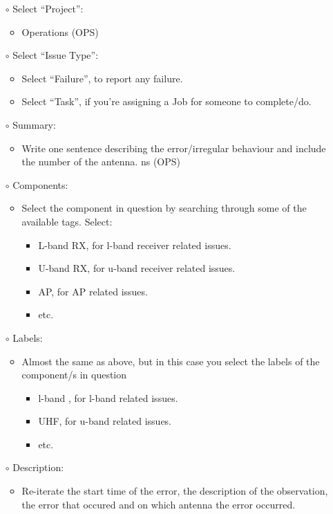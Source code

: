 \begin{itemize}
\begin{itemize}
\item[$\circ$] Select “Project”:
\begin{itemize}
\item Operations (OPS)
\end{itemize} 
\item[$\circ$] Select “Issue Type”:
\begin{itemize}
\item Select “Failure”, to report any failure.
\item Select “Task”, if you're assigning a Job for someone to complete/do.
\end{itemize}
\item[$\circ$] Summary:
\begin{itemize}
\item Write one sentence describing the error/irregular behaviour and include the number of the antenna.
ns (OPS)
\end{itemize}
\item[$\circ$] Components:
\begin{itemize}
\item Select the component in question by searching through some of the available tags. Select:
\begin{itemize}
\item L-band RX,  for l-band receiver related issues.
\item U-band RX, for u-band receiver related issues.
\item AP, for AP related issues.
\item etc.
\end{itemize}
\end{itemize}
\item[$\circ$] Labels:
\begin{itemize}
\item Almost the same as above, but in this case you select the labels of the component/s in question
\begin{itemize}
\item l-band , for l-band related issues.
\item UHF, for u-band related issues.
\item etc. 
\end{itemize}
\end{itemize}
\item[$\circ$] Description:
\begin{itemize}
\item Re-iterate the start time of the error, the description of the observation, the error that occured and on which antenna the error occurred.

\end{itemize}
\end{itemize}
\end{itemize}
